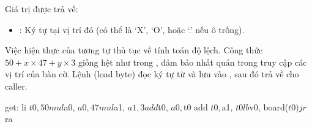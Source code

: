 Giá trị được trả về:
\begin{itemize}
    \item {}: Ký tự tại vị trí đó (có thể là `X', `O', hoặc `.' nếu ô trống).
\end{itemize}

Việc hiện thực của  tương tự thủ tục  về tính toán độ lệch. Công thức \( 50 + x \times 47 + y \times 3 \) giống hệt như trong , đảm bảo nhất quán trong truy cập các vị trí của bàn cờ. Lệnh  (load byte) đọc ký tự từ  và lưu vào , sau đó trả về cho caller.

\begin{code}
get:
	li $t0, 50
	mul $a0, $a0, 47
	mul $a1, $a1, 3
	add $t0, $a0, $t0
	add $t0, $a1, $t0
	lb 	$v0, board($t0)
	
	jr $ra
\end{code}
